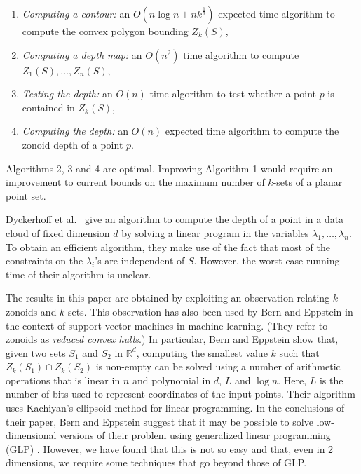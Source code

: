 \documentclass{elsart}
\begin{document}
\begin{enumerate}

\item\emph{Computing a contour:} an $O(n \log n + nk^{\frac{1}{3}})$
expected time algorithm to compute the convex polygon bounding $Z_k(S)$,

\item\emph{Computing a depth map:} an $O(n^2)$ time algorithm to compute
$Z_1(S),\ldots,Z_n(S)$,

\item\emph{Testing the depth:} an $O(n)$ time algorithm to test whether a
point $p$ is contained in $Z_k(S)$,

\item\emph{Computing the depth:} an $O(n)$ expected time algorithm to
compute the zonoid depth of a point $p$.

\end{enumerate}

Algorithms 2, 3 and 4 are optimal. Improving Algorithm 1 would require an
improvement to current bounds on the maximum number of $k$-sets
of a planar point set.

Dyckerhoff et al.\ \cite{zonoid_data_depth_theory_and_computation}
give an algorithm to compute the depth of a point in a data cloud of
fixed dimension $d$ by solving a linear program in the variables
$\lambda_1,\ldots, \lambda_n$. To obtain an efficient algorithm, they
make use of the fact that most of the constraints on the $\lambda_i$'s
are independent of $S$. However, the worst-case running time of their
algorithm is unclear. 

The results in this paper are obtained by exploiting an observation
relating $k$-zonoids and $k$-sets.  This observation has also been
used by Bern and Eppstein \cite{bern-eppstein-01} in the context of
support vector machines in machine learning.  (They refer to zonoids
as \emph{reduced convex hulls}.) In particular, Bern and Eppstein show
that, given two sets $S_1$ and $S_2$ in $\mathbb{R}^d$, computing the
smallest value $k$ such that $Z_k(S_1)\cap Z_k(S_2)$ is non-empty can
be solved using a number of arithmetic operations that is linear in
$n$ and polynomial in $d$, $L$ and $\log n$.  Here, $L$ is the number
of bits used to represent coordinates of the input points.  Their
algorithm uses Kachiyan's ellipsoid method \cite{k79} for linear
programming.  In the conclusions of their paper, Bern and Eppstein
suggest that it may be possible to solve low-dimensional versions of
their problem using generalized linear programming (GLP) \cite{msw96}.
However, we have found that this is not so easy and that, even in 2
dimensions, we require some techniques that go beyond those of GLP.
\end{document}
